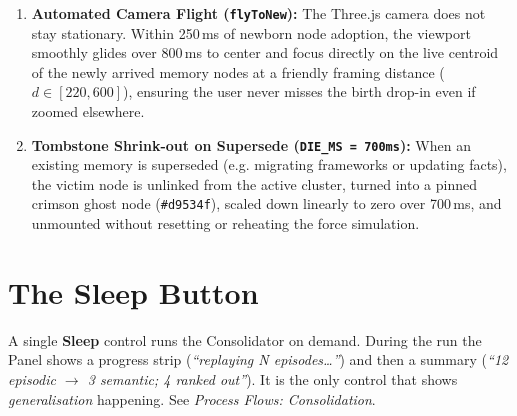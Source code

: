 \begin{enumerate}
\begin{itemize}
    Once cooled below $0.60$, $fx, fy, fz$ are released, causing the node to gravitationally glide down into its
    semantic neighborhood.
    \item \textbf{Synaptic Particle Streams:} Edges connected to the newly arrived node shoot high-speed
    directional particles in glowing electric cyan (\texttt{\#00f0ff}) to visually depict associative wiring.
    \item \textbf{Living Neural Pulse (Zero Freeze):} When at rest, nodes never freeze in place. The animation loop
    continuously drives an organic harmonic breathing wave ($r(t) = r_0 \cdot [1 + 0.10 \sin(\omega t + \phi_i)]$)
    while OrbitControls gently revolves the 3D galaxy ($\text{autoRotateSpeed} = 0.45$), eliminating any stagnant
    look on screen.
  \end{itemize}
  \item \textbf{Automated Camera Flight (\texttt{flyToNew}):}
  The Three.js camera does not stay stationary. Within 250\,ms of newborn node adoption, the viewport
  smoothly glides over 800\,ms to center and focus directly on the live centroid of the newly arrived
  memory nodes at a friendly framing distance ($d \in [220, 600]$), ensuring the user never misses the
  birth drop-in even if zoomed elsewhere.
  \item \textbf{Tombstone Shrink-out on Supersede (\texttt{DIE\_MS = 700ms}):}
  When an existing memory is superseded (e.g. migrating frameworks or updating facts), the victim node is
  unlinked from the active cluster, turned into a pinned crimson ghost node (\texttt{\#d9534f}), scaled
  down linearly to zero over 700\,ms, and unmounted without resetting or reheating the force simulation.
\end{enumerate}

\section{The Sleep Button}
A single \textbf{Sleep} control runs the Consolidator on demand. During the run the Panel shows a
progress strip (\emph{``replaying N episodes\ldots''}) and then a summary
(\emph{``12 episodic $\rightarrow$ 3 semantic; 4 ranked out''}). It is the only control that shows
\emph{generalisation} happening. See \emph{Process Flows: Consolidation}.

